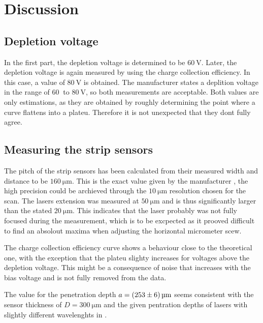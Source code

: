 \section{Discussion}
\label{sec:Discussion}

\subsection{Depletion voltage}

In the first part, the depletion voltage is determined to be $\qty{60}{\volt}$.
Later, the depletion voltage is again measured by using the charge collection efficiency.
In this case, a value of $\qty{80}{\volt}$ is obtained. The manufacturer \cite{V15} states a deplition
voltage in the range of $\qty{60}{}$ to $\qty{80}{\volt}$, so both measurements are
acceptable. Both values are only estimations, as they are obtained by roughly determining the
point where a curve flattens into a plateu. Therefore it is not unexpected that they dont fully agree.

\subsection{Measuring the strip sensors}

The pitch of the strip sensors has been calculated from their measured width and distance to be
$\qty{160}{\micro\meter}$. This is the exact value given by the manufacturer \cite{V15}, the high
precision could be archieved through the $\qty{10}{\micro\meter}$ resolution chosen for the scan.
The lasers extension was measured at $\qty{50}{\micro\meter}$ and is thus significantly larger
than the stated \cite{V15} $\qty{20}{\micro\meter}$. This indicates that the laser probably was not
fully focused during the measurement, which is to be excpected as it prooved difficult to find an
absolout maxima when adjusting the horizontal micrometer scew.

The charge collection efficiency curve shows a behaviour close to the theoretical one, with the
exception that the plateu slighty increases for voltages above the depletion voltage. This might be
a consequence of noise that increases with the bias voltage and is not fully removed from the data.

The value for the penetration depth $ a= \qty{253+-6}{\micro\meter}$ seems consistent with the sensor
thickness of $D = \qty{300}{\micro\meter}$ and the given pentration depths of lasers with slightly different
wavelenghts in \cite{V15}.


